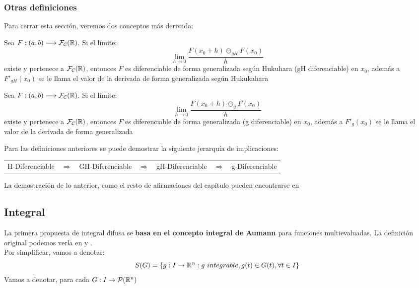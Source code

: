 \subsubsection{Otras definiciones}

Para cerrar esta sección, veremos dos conceptos más derivada:

\begin{definicion}
  Sea $F: (a, b) \longrightarrow \mathcal{F}_\mathcal{C}(\mathbb R)$. Si el límite:
  \[
  	\lim\limits_{h \rightarrow 0} \frac{F(x_0 + h) \circleddash_{gH} F(x_0)}{h}
  \]
  existe y pertenece a $\mathcal{F}_\mathcal{C} (\mathbb R)$, entonces $F$ es diferenciable de forma generalizada según Hukuhara (gH diferenciable) en $x_0$, además a $F'_{gH}(x_0)$ se le llama el valor de la derivada de forma generalizada según Hukukahara
\end{definicion}

\begin{definicion}
  \label{def:diferencial_generalizada}
  Sea $F: (a, b) \longrightarrow \mathcal{F}_\mathcal{C}(\mathbb R)$. Si el límite:
\[
\lim\limits_{h \rightarrow 0} \frac{F(x_0 + h) \circleddash_{g} F(x_0)}{h}
\]
existe y pertenece a $\mathcal{F}_\mathcal{C} (\mathbb R)$, entonces $F$ es diferenciable de forma generalizada (g diferenciable) en $x_0$, además a $F'_{g}(x_0)$ se le llama el valor de la derivada de forma generalizada
\end{definicion}

Para las definiciones anteriores se puede demostrar la siguiente jerarquía de implicaciones:
\begin{table}[h]
  \centering
  \begin{tabular}{lllllll}
    H-Diferenciable & $\Rightarrow$ & GH-Diferenciable & $\Rightarrow$ & gH-Diferenciable & $\Rightarrow$ & g-Diferenciable
  \end{tabular}
\end{table}

La demostración de lo anterior, como el resto de afirmaciones del capítulo pueden encontrarse en \cite{fuzzyintro}

\subsection{Integral}
La primera propuesta de integral difusa se \textbf{basa en el concepto integral de Aumann \cite{aumannintegral}} para funciones multievaluadas. La definición original podemos verla en \cite{integral1} y \cite{integral2}. \\
Por simplificar, vamos a denotar:
\[
S(G) = \{g : I \rightarrow \mathbb R^n : g ~ integrable, g(t) \in G(t), \forall t \in I \}
\]
Vamos a denotar, para cada $G : I \rightarrow \mathcal{P}(\mathbb R^n)$

